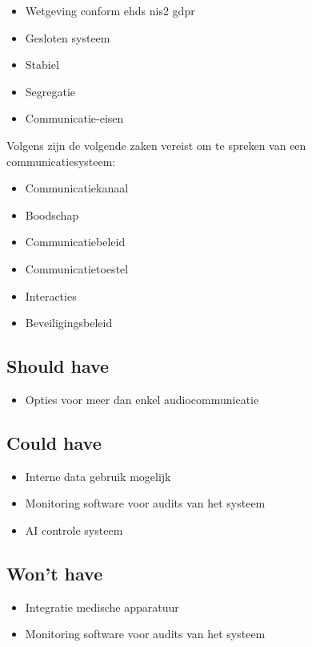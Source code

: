 \begin{itemize}
  \item Wetgeving conform
  \subitem \gls{ehds}
  \subitem \gls{nis2}
  \subitem \gls{gdpr}
  \item Gesloten systeem
  \item Stabiel
  \item Segregatie
  \item Communicatie-eisen
\end{itemize}

Volgens \textcite{Coiera2006} zijn de volgende zaken vereist om te spreken van een communicatiesysteem:
\begin{itemize}
  \item Communicatiekanaal
  \item Boodschap
  \item Communicatiebeleid
  \item Communicatietoestel
  \item Interacties
  \item Beveiligingsbeleid
\end{itemize}

\subsection{Should have}
\label{sec:Should-have}

\begin{itemize}
  \item Opties voor meer dan enkel audiocommunicatie
\end{itemize}

\subsection{Could have}
\label{sec:Could-have}

\begin{itemize}
  \item Interne data gebruik mogelijk
  \item Monitoring software voor audits van het systeem
  \item AI controle systeem
\end{itemize}

\subsection{Won't have}
\label{sec:Wont-have}

\begin{itemize}
  \item Integratie medische apparatuur
  \item Monitoring software voor audits van het systeem
\end{itemize}

